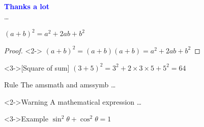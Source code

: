 \documentclass{beamer}
\begin{document}
    \section*{ }
    \begin{frame}
    \begin{center}
    \Large{\bf\textcolor{blue}{Thanks a lot}}\\[5mm] … \end{center}
    \end{frame}

    \begin{frame}[t]
        \begin{theorem}
        $(a+b)^2 = a^2 + 2ab + b^2$
        \end{theorem}
        \begin{proof}<2->
        $(a+b)^2=(a+b)(a+b)=a^2+2ab+b^2$
        \end{proof}
        \begin{example}<3->[Square of sum]
        $(3+5)^2=3^2+2\times3\times5+5^2=64$
        \end{example}
    \end{frame}


    \begin{frame}[t]
        \begin{block}{Rule}
            The amsmath and amssymb …
        \end{block}
        \begin{alertblock}<2->{Warning}
        A mathematical expression …
        \end{alertblock}
        \begin{exampleblock}<3->{Example}
        $\sin^2\theta + \cos^2\theta = 1$
        \end{exampleblock}
    \end{frame}
\end{document}

